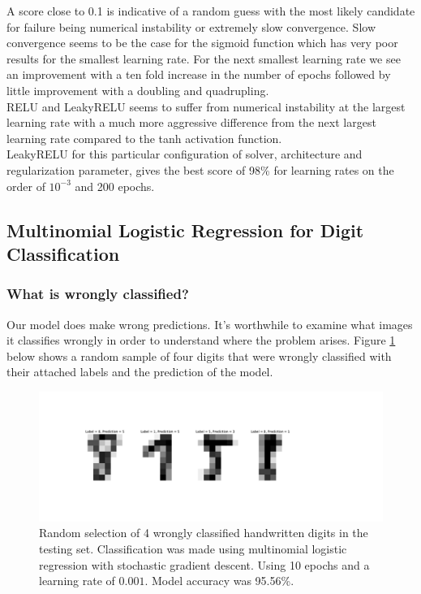 \documentclass[11pt,a4paper,titlepage]{article}
\begin{document}
A score close to 0.1 is indicative of a random guess with the most likely candidate for failure being numerical instability or extremely slow convergence. Slow convergence seems to be the case for the sigmoid function which has very poor results for the smallest learning rate. For the next smallest learning rate we see an improvement with a ten fold increase in the number of epochs followed by little improvement with a doubling and quadrupling.\\ RELU and LeakyRELU seems to suffer from numerical instability at the largest learning rate with a much more aggressive difference from the next largest learning rate compared to the tanh activation function.\\ LeakyRELU for this particular configuration of solver, architecture and regularization parameter, gives the best score of 98\% for learning rates on the order of $10^{-3}$ and 200 epochs.

\subsection{Multinomial Logistic Regression for Digit Classification}

\subsubsection{What is wrongly classified?}
Our model does make wrong predictions. It's worthwhile to examine what images it classifies wrongly in order to understand where the problem arises. Figure \ref{Digits} below shows a random sample of four digits that were wrongly classified with their attached labels and the prediction of the model.

\begin{figure}[H]
\centering

\includegraphics[trim=6cm 5.0cm 12cm 5.0cm, clip=true,scale = 0.5]{Wrong_predictions_LogReg.pdf}
\caption[Wrongly classified Digits]{Random selection of 4 wrongly classified handwritten digits in the testing set. Classification was made using multinomial logistic regression with stochastic gradient descent. Using 10 epochs and a learning rate of $0.001$. Model accuracy was 95.56\%.}\label{Digits}
\end{figure}
\end{document}
